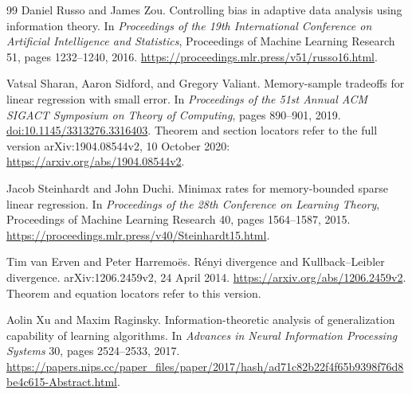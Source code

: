 \begin{thebibliography}{99}
Daniel Russo and James Zou.
\newblock Controlling bias in adaptive data analysis using information theory.
\newblock In \emph{Proceedings of the 19th International Conference on Artificial
Intelligence and Statistics}, Proceedings of Machine Learning Research 51,
pages 1232--1240, 2016.
\newblock \url{https://proceedings.mlr.press/v51/russo16.html}.

Vatsal Sharan, Aaron Sidford, and Gregory Valiant.
\newblock Memory-sample tradeoffs for linear regression with small error.
\newblock In \emph{Proceedings of the 51st Annual ACM SIGACT Symposium on Theory
of Computing}, pages 890--901, 2019.
\newblock \href{https://doi.org/10.1145/3313276.3316403}{doi:10.1145/3313276.3316403}.
Theorem and section locators refer to the full version
arXiv:1904.08544v2, 10 October 2020:
\url{https://arxiv.org/abs/1904.08544v2}.

Jacob Steinhardt and John Duchi.
\newblock Minimax rates for memory-bounded sparse linear regression.
\newblock In \emph{Proceedings of the 28th Conference on Learning Theory},
Proceedings of Machine Learning Research 40, pages 1564--1587, 2015.
\newblock \url{https://proceedings.mlr.press/v40/Steinhardt15.html}.

Tim van Erven and Peter Harremo\"es.
\newblock R\'enyi divergence and Kullback--Leibler divergence.
\newblock arXiv:1206.2459v2, 24 April 2014.
\newblock \url{https://arxiv.org/abs/1206.2459v2}.
Theorem and equation locators refer to this version.

Aolin Xu and Maxim Raginsky.
\newblock Information-theoretic analysis of generalization capability of learning algorithms.
\newblock In \emph{Advances in Neural Information Processing Systems} 30,
pages 2524--2533, 2017.
\newblock \url{https://papers.nips.cc/paper_files/paper/2017/hash/ad71c82b22f4f65b9398f76d8be4c615-Abstract.html}.

\end{thebibliography}
